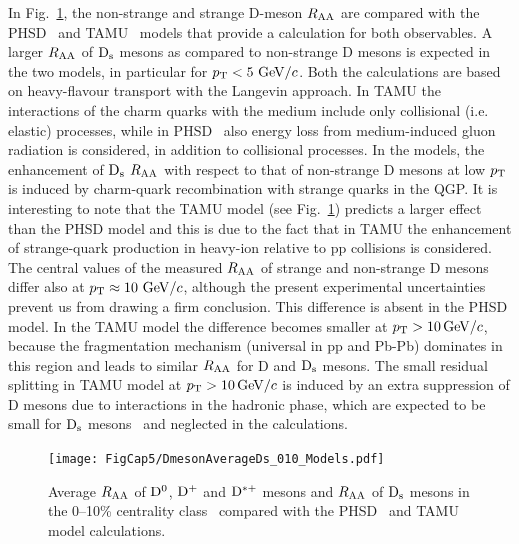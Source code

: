 In Fig.~\ref{fig:DandDsRaaWithModels},  the non-strange and 
strange D-meson $R_{\rm AA}$ are compared with  
the PHSD~\cite{Song:2015ykw} and 
 TAMU~\cite{He:2014cla} models that provide a calculation for both observables. A larger
 $R_{\rm AA}$ of ${\rm D_s}$ mesons as compared to non-strange D mesons is expected in the two models, in particular for $p_{\rm T}<5~\mathrm{GeV}/c$.
Both the calculations are based on heavy-flavour transport with the Langevin approach.
In TAMU the interactions of the charm quarks with the medium include only collisional (i.e.\,elastic) processes, 
while in PHSD~\cite{Song:2015ykw} also energy loss from medium-induced gluon radiation
is considered, in addition to collisional processes.
In the models, the enhancement of ${\rm D_s}$ $R_{\rm AA}$ with respect to that of non-strange D mesons at low $p_{\rm T}$ is induced 
by charm-quark recombination with strange quarks in the QGP.
It is interesting to note that the TAMU model (see Fig.~\ref{fig:DandDsRaaWithModels}) predicts a larger effect than the 
 PHSD model and this is due to the fact that in TAMU the enhancement
of strange-quark production in heavy-ion relative to pp collisions is considered.
The central values of the measured $R_{\rm AA}$ of strange and non-strange D mesons differ also 
at $p_{\rm T} \approx 10~\mathrm{GeV}/c$, although the present experimental 
uncertainties prevent us from drawing a firm conclusion. This 
difference is absent in the PHSD model. In the TAMU model the difference  
becomes smaller at $p_{\rm T} > 10 \, \mathrm{GeV}/c$, because the fragmentation mechanism (universal in pp and Pb-Pb) dominates in this region and 
leads to similar $R_{\rm AA}$ for D and ${\rm D_s}$ mesons. The small residual splitting in TAMU model at $p_{\rm T} > 10 \, \mathrm{GeV}/c$ is induced by an extra suppression of D mesons
due to interactions in the hadronic phase, which are expected to be small for ${\rm D_s}$ mesons~\cite{He:2012df} and
neglected in the calculations. 
\\


\begin{figure}[!t]
 \begin{center}
\texttt{[image: FigCap5/DmesonAverageDs\_010\_Models.pdf]}
 \end{center}
 \caption{Average $R_{\rm AA}$ of ${\rm D^0}$, ${\rm D^+}$ and ${\rm D^{*+}}$ mesons and $R_{\rm AA}$ of ${\rm D_s}$ mesons in the 0--10\% centrality class~\cite{ALICE-PUBLIC-2017-003} compared with the PHSD~\cite{Song:2015ykw}  and TAMU~\cite{He:2014cla} model calculations.}
 \label{fig:DandDsRaaWithModels} 
\end{figure} 




